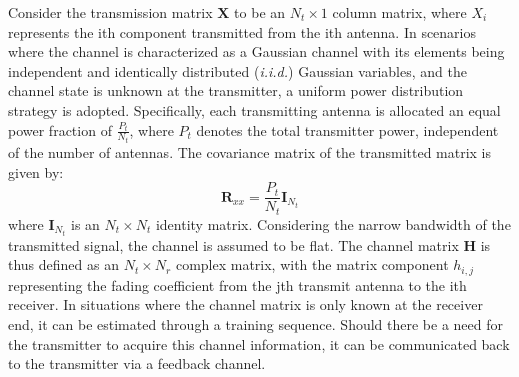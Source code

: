 \documentclass[lettersize,journal]{IEEEtran}
\begin{document}
Consider the transmission matrix \( \mathbf{X} \) to be an \( N_t \times 1 \) column matrix, where \( X_i \) represents the ith component transmitted from the ith antenna. In scenarios where the channel is characterized as a Gaussian channel with its elements being independent and identically distributed (\textit{i.i.d.}) Gaussian variables, and the channel state is unknown at the transmitter, a uniform power distribution strategy is adopted. Specifically, each transmitting antenna is allocated an equal power fraction of \( \frac{P_t}{N_t} \), where \( P_t\) denotes the total transmitter power, independent of the number of antennas. The covariance matrix of the transmitted matrix is given by:
\begin{equation}
\mathbf{R}_{xx} = \frac{P_t}{N_t} \mathbf{I}_{N_t}
\end{equation}
where \( \mathbf{I}_{N_t} \) is an \( N_t \times N_t \) identity matrix. Considering the narrow bandwidth of the transmitted signal, the channel is assumed to be flat. The channel matrix \( \mathbf{H} \) is thus defined as an \( N_t \times N_r \) complex matrix, with the matrix component \( h_{i,j} \) representing the fading coefficient from the jth transmit antenna to the ith receiver. In situations where the channel matrix is only known at the receiver end, it can be estimated through a training sequence. Should there be a need for the transmitter to acquire this channel information, it can be communicated back to the transmitter via a feedback channel\cite{liao2019csi}.
\end{document}

